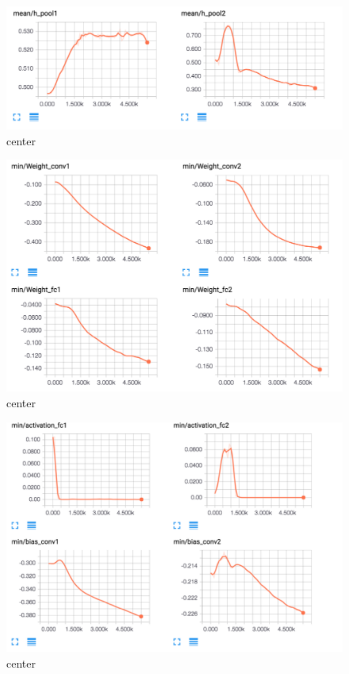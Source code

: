 \documentclass[12pt]{article}
\begin{document}
\begin{figure}[H]
  \caption{center}
  \centering
    \includegraphics[scale=0.3]{mean4.png}
\end{figure}
\begin{figure}[H]
  \caption{center}
  \centering
    \includegraphics[scale=0.3]{min.png}
\end{figure}
\begin{figure}[H]
  \caption{center}
  \centering
    \includegraphics[scale=0.3]{min2.png}
\end{figure}
\end{document}
